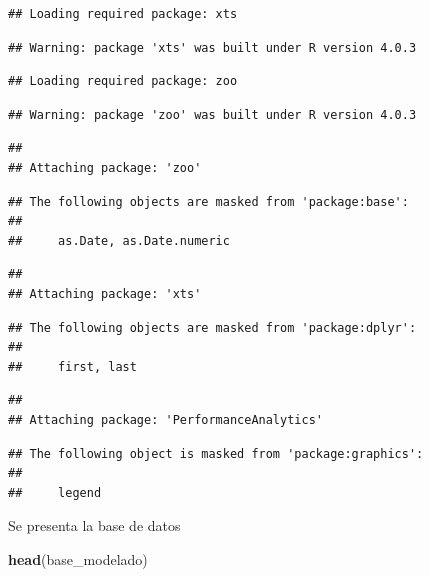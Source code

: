 \documentclass[
  11pt,
]{article}
\newenvironment{Shaded}{\begin{snugshade}}{\end{snugshade}}
\newcommand{\KeywordTok}[1]{\textcolor[rgb]{0.13,0.29,0.53}{\textbf{#1}}}
\newcommand{\NormalTok}[1]{#1}
\begin{document}
\begin{verbatim}
## Loading required package: xts
\end{verbatim}

\begin{verbatim}
## Warning: package 'xts' was built under R version 4.0.3
\end{verbatim}

\begin{verbatim}
## Loading required package: zoo
\end{verbatim}

\begin{verbatim}
## Warning: package 'zoo' was built under R version 4.0.3
\end{verbatim}

\begin{verbatim}
## 
## Attaching package: 'zoo'
\end{verbatim}

\begin{verbatim}
## The following objects are masked from 'package:base':
## 
##     as.Date, as.Date.numeric
\end{verbatim}

\begin{verbatim}
## 
## Attaching package: 'xts'
\end{verbatim}

\begin{verbatim}
## The following objects are masked from 'package:dplyr':
## 
##     first, last
\end{verbatim}

\begin{verbatim}
## 
## Attaching package: 'PerformanceAnalytics'
\end{verbatim}

\begin{verbatim}
## The following object is masked from 'package:graphics':
## 
##     legend
\end{verbatim}

Se presenta la base de datos

\begin{Shaded}
\begin{Highlighting}[]
\KeywordTok{head}\NormalTok{(base_modelado)}
\end{Highlighting}
\end{Shaded}
\end{document}
